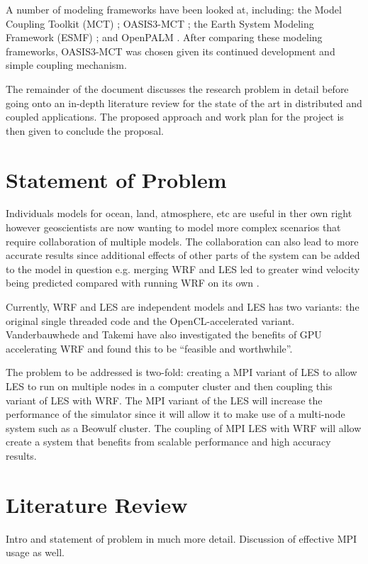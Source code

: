 \documentclass{acm_proc_article-sp}
\begin{document}
A number of modeling frameworks have been looked at, including: the Model
Coupling Toolkit (MCT) \cite{Larson2005}; OASIS3-MCT \cite{Valcke,Valcke2013};
the Earth System Modeling Framework (ESMF) \cite{Ramework2004}; and OpenPALM
\cite{Piacentini2011}. After comparing these modeling frameworks, OASIS3-MCT was
chosen given its continued development and simple coupling mechanism.

The remainder of the document discusses the research problem in detail before
going onto an in-depth literature review for the state of the art in distributed
and coupled applications. The proposed approach and work plan for the project is
then given to conclude the proposal.

\section*{Statement of Problem}

Individuals models for ocean, land, atmosphere, etc are useful in ther own right
however geoscientists are now wanting to model more complex scenarios that
require collaboration of multiple models. The collaboration can also lead to
more accurate results since additional effects of other parts of the system can
be added to the model in question e.g. merging WRF and LES led to greater wind
velocity being predicted compared with running WRF on its own
\cite{Kinbara2010,Nakayama1998}.

Currently, WRF and LES are independent models and LES has two variants: the
original single threaded code and the OpenCL-accelerated variant. Vanderbauwhede
and Takemi \cite{Vanderbauwhede2013} have also investigated the benefits of GPU
accelerating WRF and found this to be ``feasible and worthwhile''.

The problem to be addressed is two-fold: creating a MPI variant of LES to allow
LES to run on multiple nodes in a computer cluster and then coupling this
variant of LES with WRF. The MPI variant of the LES will increase the
performance of the simulator since it will allow it to make use of a multi-node
system such as a Beowulf cluster. The coupling of MPI LES with WRF will allow
create a system that benefits from scalable performance and high accuracy
results.

\section*{Literature Review}

Intro and statement of problem in much more detail. Discussion of effective MPI
usage as well.
\end{document}
